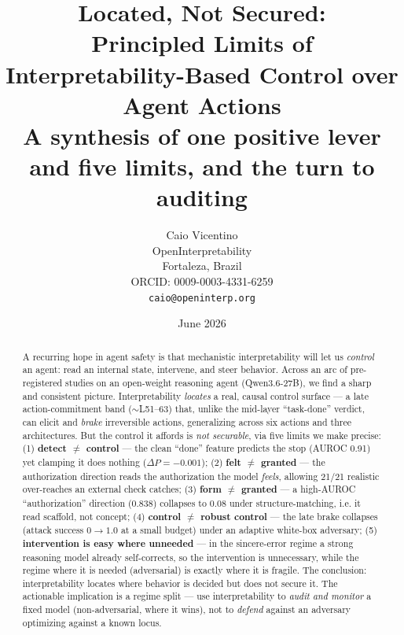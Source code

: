 \documentclass[11pt]{article}
\title{Located, Not Secured:\\ Principled Limits of Interpretability-Based Control over Agent Actions\\[2pt]
\large A synthesis of one positive lever and five limits, and the turn to auditing}
\author{Caio Vicentino \\ OpenInterpretability \\ Fortaleza, Brazil \\
ORCID: 0009-0003-4331-6259 \\ \texttt{caio@openinterp.org}}
\date{June 2026}
\begin{document}
\maketitle

\begin{abstract}
A recurring hope in agent safety is that mechanistic interpretability will let us \emph{control} an agent:
read an internal state, intervene, and steer behavior. Across an arc of pre-registered studies on an open-weight
reasoning agent (Qwen3.6-27B), we find a sharp and consistent picture. Interpretability \emph{locates} a real,
causal control surface --- a late action-commitment band ($\sim$L51--63) that, unlike the mid-layer ``task-done''
verdict, can elicit and \emph{brake} irreversible actions, generalizing across six actions and three
architectures. But the control it affords is \emph{not securable}, via five limits we make precise: (1)
\textbf{detect $\neq$ control} --- the clean ``done'' feature predicts the stop (AUROC 0.91) yet clamping it does
nothing ($\Delta P = -0.001$); (2) \textbf{felt $\neq$ granted} --- the authorization direction reads the
authorization the model \emph{feels}, allowing 21/21 realistic over-reaches an external check catches; (3)
\textbf{form $\neq$ granted} --- a high-AUROC ``authorization'' direction (0.838) collapses to 0.08 under
structure-matching, i.e. it read scaffold, not concept; (4) \textbf{control $\neq$ robust control} --- the late
brake collapses (attack success $0\to1.0$ at a small budget) under an adaptive white-box adversary; (5)
\textbf{intervention is easy where unneeded} --- in the sincere-error regime a strong reasoning model already
self-corrects, so the intervention is unnecessary, while the regime where it is needed (adversarial) is exactly
where it is fragile. The conclusion: interpretability locates where behavior is decided but does not secure it.
The actionable implication is a regime split --- use interpretability to \emph{audit and monitor} a fixed model
(non-adversarial, where it wins), not to \emph{defend} against an adversary optimizing against a known locus.
\end{abstract}
\end{document}
